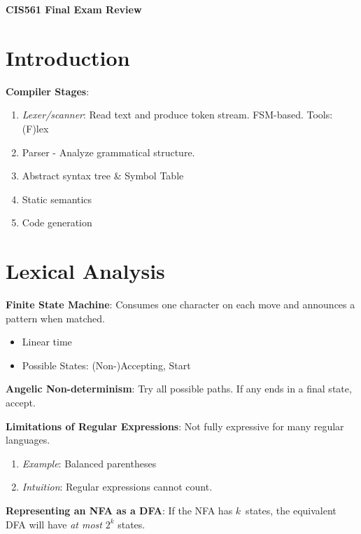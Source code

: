 \documentclass[10pt,twocolumn]{report}
\begin{document}
  \twocolumn
  
  \begin{@twocolumnfalse}
    \begin{center}
      \LARGE \textbf{CIS561 Final Exam Review}
    \end{center}
  \end{@twocolumnfalse}
  
  \section{Introduction}
  
  \textbf{Compiler Stages}:
  \begin{enumerate}
    \item \textit{Lexer/scanner}: Read text and produce token stream. FSM-based.  Tools: (F)lex
    \item Parser - Analyze grammatical structure.
    \item Abstract syntax tree \& Symbol Table
    \item Static semantics
    \item Code generation
  \end{enumerate}

  \section{Lexical Analysis}
  
  \textbf{Finite State Machine}: Consumes one character on each move and announces a pattern when matched.
  \begin{itemize}
    \item Linear time
    \item Possible States: (Non-)Accepting, Start
  \end{itemize}

  \textbf{Angelic Non-determinism}: Try all possible paths. If any ends in a final state, accept.
  
  \textbf{Limitations of Regular Expressions}: Not fully expressive for many regular languages.
  \begin{enumerate}
    \item \textit{Example}: Balanced parentheses
    \item \textit{Intuition}: Regular expressions cannot count.
  \end{enumerate}

  \textbf{Representing an NFA as a DFA}: If the NFA has $k$~states, the equivalent DFA will have \textit{at most} $2^{k}$ states.
  
\end{document}

